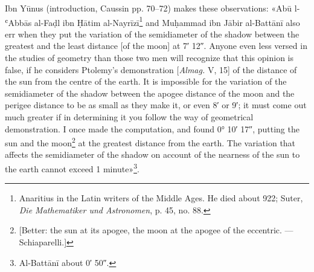 \documentclass[11pt]{article}
\begin{document}
\par Ibn Yūnus (introduction, Caussin pp. 70–72) makes these observations: «Abū l-ʿAbbās al-Faḍl ibn Ḥātim al-Nayrīzī\footnote{Anaritius in the Latin writers of the Middle Ages. He died about 922; Suter, \emph{Die Mathematiker und Astronomen}, p. 45, no. 88.} and Muḥammad ibn Jābir al-Battānī also err when they put the variation of the semidiameter of the shadow between the greatest and the least distance [of the moon] at 7′ 12″. Anyone even less versed in the studies of geometry than those two men will recognize that this opinion is false, if he considers Ptolemy's demonstration [\emph{Almag.} V, 15] of the distance of the sun from the centre of the earth. It is impossible for the variation of the semidiameter of the shadow between the apogee distance of the moon and the perigee distance to be as small as they make it, or even 8′ or 9′; it must come out much greater if in determining it you follow the way of geometrical demonstration. I once made the computation, and found 0° 10′ 17″, putting the sun and the moon\footnote{[Better: the sun at its apogee, the moon at the apogee of the eccentric. — Schiaparelli.]} at the greatest distance from the earth. The variation that affects the semidiameter of the shadow on account of the nearness of the sun to the earth cannot exceed 1 minute»\footnote{Al-Battānī about 0′ 50″.}.\par
\begin{center}\end{center}
\par [What Ibn Yūnus says is demonstrated in this way. Let RN be the radius of the shadow at the least distance, measured in minutes and seconds by the angle RMN; R′N′ the radius of the shadow at the greatest distance, measured by the angle R′MN′. KRM is the greatest parallax of the moon, amounting according to al-Battānī to 63′ 51″\footnoteT{The print has 64′ 51″ here and in the first line below; 63′ 51″ less 53′ 34″ gives the difference 10′ 17″ that follows, which Ibn Yūnus found, and 53′ 34″ is the angle whose sine is 1/64;10, the parallax at al-Battānī's greatest distance of the moon, 64;10 earth radii.} at the syzygies; KR′M is the least parallax, according to al-Battānī 53′ 34″. Let $\varphi$ be the angle KVM at the vertex of the cone of the shadow. In the triangle MRV we have \[ KRM = 63'\,51'' = \varphi + RMV, \] \[ KR'M = 53'\,34'' = \varphi + R'MV, \] \[ \text{difference}\quad \overline{10'\,17''} = RMV - R'MV = RMR', \] and RMR′ is, as an angle, the difference between the greatest and the least shadow. Plainly the angle 10′ 17″ is always the same, although the distance of the sun and the angle of the cone of the shadow vary. — Schiaparelli.]\par
\end{document}
